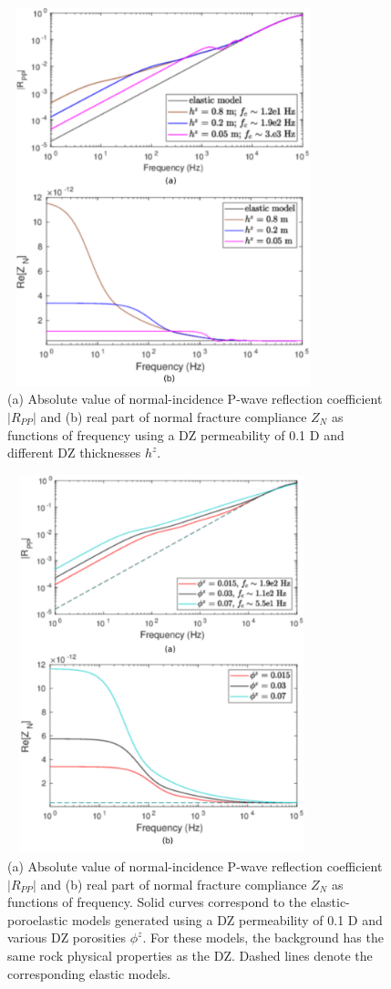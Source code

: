 \documentclass[draft]{agujournal2019}
\begin{document}
\begin{figure}
\centering
        \includegraphics[width=90mm, height=110mm]{Figure4.pdf}
\caption {(a) Absolute value of normal-incidence P-wave reflection coefficient $|R_{PP}|$ and (b) real part of normal fracture compliance $Z_N$ as functions of frequency using a DZ permeability of 0.1 D and different DZ thicknesses $h^z$.}
\label{fig:4}
\end{figure}

\begin{figure}
\centering
        \includegraphics[width=90mm, height=110mm]{Figure5.pdf}
\caption { 
(a) Absolute value of normal-incidence P-wave reflection coefficient $|R_{PP}|$ and (b) real part of normal fracture compliance $Z_N$ as functions of frequency. Solid curves correspond to the elastic-poroelastic models generated using a DZ permeability of 0.1 D and various DZ porosities $\phi^z$. For these models, the background has the same rock physical properties as the DZ. Dashed lines denote the corresponding elastic models.
}
\label{fig:5}
\end{figure}
\end{document}
